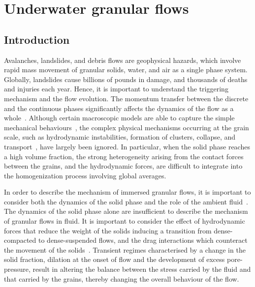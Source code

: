 \chapter{Underwater granular flows}

\ifpdf
    \graphicspath{{Chapter6/figs/raster/}{Chapter6/figs/pdf/}{Chapter6/figs/}}
\else
    \graphicspath{{Chapter6/figs/vector/}{Chapter6/figs/}}
\fi

\section{Introduction}
Avalanches, landslides, and debris flows are geophysical hazards, which involve 
rapid mass movement of granular solids, water, and air as a single phase 
system. Globally, landslides cause billions of pounds in damage, and thousands 
of deaths and injuries each year. Hence, it is important to understand the 
triggering mechanism and the flow evolution. The momentum transfer between the 
discrete and the continuous phases significantly affects the dynamics of the 
flow as a whole~\citep{Topin2012}. Although certain macroscopic models are able 
to capture the simple mechanical behaviours~\citep{Peker2007}, the complex 
physical mechanisms occurring at the grain scale, such as hydrodynamic 
instabilities, formation of clusters, collapse, and 
transport~\citep{Topin2011}, have largely been ignored. In particular, when the 
solid phase reaches a high volume fraction, the strong heterogeneity arising 
from the contact forces between the grains, and the hydrodynamic forces, are 
difficult to integrate into the homogenization process involving global 
averages. 

In order to describe the mechanism of immersed 
granular flows, it is important to consider both the dynamics of the solid 
phase and the role of the ambient fluid~\citep{Denlinger2001}. The dynamics of 
the solid phase alone are insufficient to describe the mechanism of granular 
flows in fluid. It is important to consider the effect of hydrodynamic forces 
that reduce the weight of the solids inducing a transition from dense-compacted 
to dense-suspended flows, and the drag interactions which counteract the 
movement of the solids~\citep{Meruane2010}. Transient regimes characterised by 
a change in the solid fraction, dilation at the onset of flow and the 
development of excess pore-pressure, result in altering the balance between the 
stress carried by the fluid and that carried by the grains, thereby changing 
the overall behaviour of the flow. 

